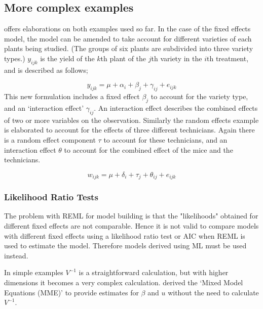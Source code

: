 \documentclass[12pt, a4paper]{report}
\begin{document}
\subsection{More complex examples}
\citet{Searle} offers elaborations on both examples used so far.
In the case of the fixed effects model, the model can be amended
to take account for different varieties of each plants being
studied. (The groups of six plants are subdivided into three
variety types.) $y_{ijk}$ is the yield of the $k$th plant of the
$j$th variety in the $i$th treatment, and is described as follows;

\begin{equation}
y_{ijk} = \mu + \alpha_{i} + \beta_{j} + \gamma_{ij} + e_{ijk}
\end{equation}
This new formulation includes a fixed effect $\beta_{j}$ to
account for the variety type, and an `interaction effect'
$\gamma_{ij}$. An interaction effect describes the combined
effects of two or more variables on the observation. Similarly the
random effects example is elaborated to account for the effects of
three different technicians. Again there is a random effect
component $\tau$ to account for these technicians, and an
interaction effect $\theta$ to account for the combined effect of
the mice and the technicians.

\begin{equation}
w_{ijk} = \mu + \delta_{i} + \tau_{j} + \theta_{ij} + e_{ijk}
\end{equation}


\subsubsection{Likelihood Ratio Tests} The problem with REML for
model building is that the "likelihoods" obtained for different
fixed effects are not comparable. Hence it is not valid to compare
models with different fixed effects using a likelihood ratio test
or AIC when REML is used to estimate the model. Therefore models
derived using ML must be used instead.





\newpage


In simple examples $V^{-1}$ is a straightforward calculation, but
with higher dimensions it becomes a very complex calculation.
\citet{Henderson50, Henderson63, Henderson73, Henderson84a}
derived the `Mixed Model Equations (MME)' to provide estimates for
$\beta$ and $u$ without the need to calculate $V^{-1}$.
\end{document}
